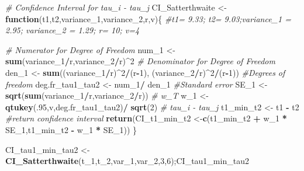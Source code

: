 \documentclass[12pt,]{article}
\newenvironment{Shaded}{\begin{snugshade}}{\end{snugshade}}
\newcommand{\KeywordTok}[1]{\textcolor[rgb]{0.13,0.29,0.53}{\textbf{#1}}}
\newcommand{\DecValTok}[1]{\textcolor[rgb]{0.00,0.00,0.81}{#1}}
\newcommand{\StringTok}[1]{\textcolor[rgb]{0.31,0.60,0.02}{#1}}
\newcommand{\CommentTok}[1]{\textcolor[rgb]{0.56,0.35,0.01}{\textit{#1}}}
\newcommand{\ControlFlowTok}[1]{\textcolor[rgb]{0.13,0.29,0.53}{\textbf{#1}}}
\newcommand{\OperatorTok}[1]{\textcolor[rgb]{0.81,0.36,0.00}{\textbf{#1}}}
\newcommand{\NormalTok}[1]{#1}
\begin{document}
\begin{Shaded}
\begin{Highlighting}[]
\CommentTok{# Confidence Interval for tau_i - tau_j}
\NormalTok{CI_Satterthwaite <-}\StringTok{ }\ControlFlowTok{function}\NormalTok{(t1,t2,variance_}\DecValTok{1}\NormalTok{,variance_}\DecValTok{2}\NormalTok{,r,v)\{}
 \CommentTok{#t1= 9.33; t2= 9.03;variance_1 = 2.95; variance_2 = 1.29; r= 10; v=4}
  
\CommentTok{# Numerator for Degree of Freedom}
\NormalTok{num_}\DecValTok{1}\NormalTok{ <-}\StringTok{ }\KeywordTok{sum}\NormalTok{(variance_}\DecValTok{1}\OperatorTok{/}\NormalTok{r,variance_}\DecValTok{2}\OperatorTok{/}\NormalTok{r)}\OperatorTok{^}\DecValTok{2}
\CommentTok{# Denominator for Degree of Freedom}
\NormalTok{den_}\DecValTok{1}\NormalTok{ <-}\StringTok{ }\KeywordTok{sum}\NormalTok{((variance_}\DecValTok{1}\OperatorTok{/}\NormalTok{r)}\OperatorTok{^}\DecValTok{2}\OperatorTok{/}\NormalTok{(r}\OperatorTok{-}\DecValTok{1}\NormalTok{), (variance_}\DecValTok{2}\OperatorTok{/}\NormalTok{r)}\OperatorTok{^}\DecValTok{2}\OperatorTok{/}\NormalTok{(r}\OperatorTok{-}\DecValTok{1}\NormalTok{))}
\CommentTok{#Degrees of freedom}
\NormalTok{deg.fr_tau1_tau2 <-}\StringTok{ }\NormalTok{num_}\DecValTok{1}\OperatorTok{/}\StringTok{ }\NormalTok{den_}\DecValTok{1}
\CommentTok{#Standard error}
\NormalTok{SE_}\DecValTok{1}\NormalTok{ <-}\StringTok{ }\KeywordTok{sqrt}\NormalTok{(}\KeywordTok{sum}\NormalTok{(variance_}\DecValTok{1}\OperatorTok{/}\NormalTok{r,variance_}\DecValTok{2}\OperatorTok{/}\NormalTok{r))}
\CommentTok{# w_T}
\NormalTok{w_}\DecValTok{1}\NormalTok{ <-}\StringTok{ }\KeywordTok{qtukey}\NormalTok{(.}\DecValTok{95}\NormalTok{,v,deg.fr_tau1_tau2)}\OperatorTok{/}\StringTok{ }\KeywordTok{sqrt}\NormalTok{(}\DecValTok{2}\NormalTok{)}
\CommentTok{# tau_i - tau_j}
\NormalTok{t1_min_t2 <-}\StringTok{ }\NormalTok{t1 }\OperatorTok{-}\StringTok{ }\NormalTok{t2}
\CommentTok{#return confidence interval}
\KeywordTok{return}\NormalTok{(CI_t1_min_t2 <-}\KeywordTok{c}\NormalTok{(t1_min_t2 }\OperatorTok{+}\StringTok{ }\NormalTok{w_}\DecValTok{1} \OperatorTok{*}\StringTok{ }\NormalTok{SE_}\DecValTok{1}\NormalTok{,t1_min_t2 }\OperatorTok{-}\StringTok{ }\NormalTok{w_}\DecValTok{1} \OperatorTok{*}\StringTok{ }\NormalTok{SE_}\DecValTok{1}\NormalTok{))}
\NormalTok{\}}


\NormalTok{CI_tau1_min_tau2 <-}\StringTok{ }\KeywordTok{CI_Satterthwaite}\NormalTok{(t_}\DecValTok{1}\NormalTok{,t_}\DecValTok{2}\NormalTok{,var_}\DecValTok{1}\NormalTok{,var_}\DecValTok{2}\NormalTok{,}\DecValTok{3}\NormalTok{,}\DecValTok{6}\NormalTok{);CI_tau1_min_tau2}
\end{Highlighting}
\end{Shaded}
\end{document}
